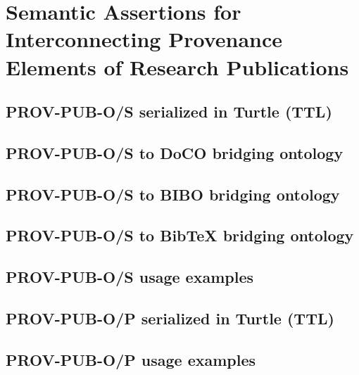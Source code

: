 \chapter{Semantic Assertions for Interconnecting Provenance Elements of Research Publications}
\label{ch:ontologies}

\section{PROV-PUB-O/S serialized in Turtle (TTL)}

\section{PROV-PUB-O/S to DoCO bridging ontology}

\section{PROV-PUB-O/S to BIBO bridging ontology}

\section{PROV-PUB-O/S to BibTeX bridging ontology}

\section{PROV-PUB-O/S usage examples}

\section{PROV-PUB-O/P serialized in Turtle (TTL)}

\section{PROV-PUB-O/P usage examples}


